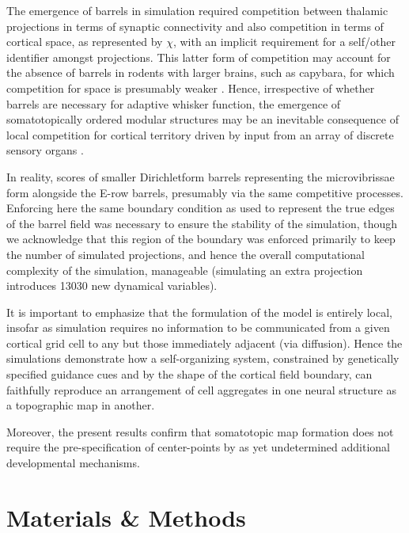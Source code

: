 \documentclass[9pt,lineno]{elife}
\newcommand{\cmnt}[1]{\textcolor{colcmnt}{#1}}
\begin{document}
The emergence of barrels in simulation required competition between thalamic
projections in terms of synaptic connectivity and also competition in terms of
cortical space, as represented by $\chi$, with an implicit requirement for a
self/other identifier amongst projections. This latter form of competition may
account for the absence of barrels in rodents with larger brains, such as
capybara, for which competition for space is presumably weaker
\citep{woolsey_comparative_1975}. Hence, irrespective of whether barrels are
necessary for adaptive whisker function, the emergence of somatotopically
ordered modular structures may be an inevitable consequence of local
competition for cortical territory driven by input from an array of discrete
sensory organs \citep{purves_iterated_1992}.

\cmnt{In reality, scores of smaller Dirichletform barrels representing the
  microvibrissae form alongside the E-row barrels, presumably via the same
  competitive processes. Enforcing here
  the same boundary condition as used to represent the true edges of the
  barrel field was necessary to ensure the stability of the simulation, though
  we acknowledge that this region of the boundary was enforced primarily to
  keep the number of simulated projections, and hence the overall
  computational complexity of the simulation, manageable (simulating an extra
  projection introduces 13030 new dynamical variables).}

It is important to emphasize that the formulation of the model is entirely
local, insofar as simulation requires no information to be communicated from a
given cortical grid cell to any but those immediately adjacent (via
diffusion). Hence the simulations demonstrate how a self-organizing system,
constrained by genetically specified guidance cues and by the shape of the
cortical field boundary, can faithfully reproduce an arrangement of cell
aggregates in one neural structure as a topographic map in another.

Moreover, the present results confirm that somatotopic map formation does not
require the pre-specification of center-points by as yet undetermined
additional developmental mechanisms.

\section{Materials \& Methods}

%
%
\end{document}
